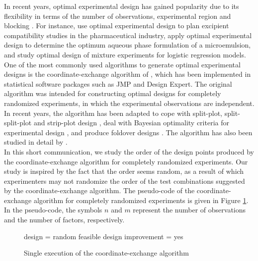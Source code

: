 





In recent years, optimal experimental design has gained popularity due to its flexibility in terms of the number of observations, experimental region and blocking \citep{goos}. For instance, \cite{akkermans} use optimal experimental design to plan excipient compatibility studies in the pharmaceutical industry, \cite{jeirani} apply optimal experimental design to determine the optimum aqueous phase formulation of a microemulsion, and \cite{mancenido} study optimal design of mixture experiments for logistic regression models.\\

One of the most commonly used algorithms to generate optimal experimental designs is the coordinate-exchange algorithm of \cite{meyer}, which has been implemented in statistical software packages such as JMP and Design Expert. The original algorithm was intended for constructing optimal designs for completely randomized experiment{\color{red}s}, in which the experimental observations are independent. In recent years, the algorithm has been adapted to cope with split-plot, split-split-plot and strip-plot design \citep{jones2,jones,arnouts,arnouts2,trinca}, deal with Bayesian optimality criteria for experimental design \citep{kessels,mylona,mylona2}, and produce foldover designs \citep{errore}. The algorithm has also been studied in detail by \citet{cuervo}.\\

In this short communication, we study the order of the design points produced by the coor\-di\-nate-exchange algorithm for completely randomized experiments. Our study is inspired by the fact that the order seems random, as a result of which experimenters may not randomize the order of the test combinations suggested by the coordinate-exchange algorithm. The pseudo-code of the coordinate-exchange algorithm for completely randomized experiments is given in Figure \ref{pseudo1}. In the pseudo-code, the symbols $n$ and $m$ represent the number of observations and the number of factors, respectively.\\
\begin{figure}[H]
\begin{algorithm}[H]
\label{pseudo1}
design = random feasible design\;
improvement = yes\;
	\end{algorithm}
	\caption{{\color{red}Single execution of the} coordinate-exchange algorithm}
\end{figure}

